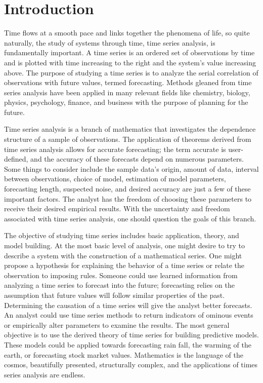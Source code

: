 \documentclass[../main.tex]{subfiles}
\begin{document}
    \section{Introduction}\label{sec:introduction}
    Time flows at a smooth pace and links together the phenomena of life, so quite naturally,
    the study of systems through time, time series analysis, is fundamentally important.
    A time series is an ordered set of observations by time and is plotted with time increasing to the right and the system's value increasing above.
    The purpose of studying a time series is to analyze the serial correlation of observations with future values, termed forecasting.
    Methods gleaned from time series analysis have been applied in many relevant fields like chemistry, biology, physics, psychology, finance, and business with the purpose of planning for the future.

    Time series analysis is a branch of mathematics that investigates the dependence structure of a sample of observations.
    The application of theorems derived from time series analysis allows for accurate forecasting; the term accurate is user-defined, and the accuracy of these forecasts depend on numerous parameters.
    Some things to consider include the sample data's origin, amount of data, interval between observations, choice of model, estimation of model parameters, forecasting length, suspected noise, and desired accuracy are just a few of these important factors.
    The analyst has the freedom of choosing these parameters to receive their desired empirical results.
    With the uncertainty and freedom associated with time series analysis, one should question the goals of this branch.

    The objective of studying time series includes basic application, theory, and model building.
    At the most basic level of analysis, one might desire to try to describe a system with the construction of a mathematical series.
    One might propose a hypothesis for explaining the behavior of a time series or relate the observation to imposing rules.
    Someone could use learned information from analyzing a time series to forecast into the future; forecasting relies on the assumption that future values will follow similar properties of the past.
    Determining the causation of a time series will give the analyst better forecasts.
    An analyst could use time series methods to return indicators of ominous events or empirically alter parameters to examine the results.
    The most general objective is to use the derived theory of time series for building predictive models.
    These models could be applied towards forecasting rain fall, the warming of the earth, or forecasting stock market values.
    Mathematics is the language of the cosmos, beautifully presented, structurally complex, and the applications of times series analysis are endless. %
\end{document}
